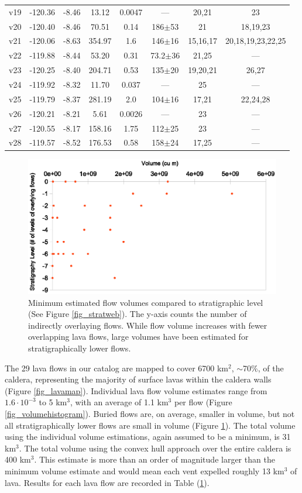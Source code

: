 \documentclass[12pt,letter]{article}
\begin{document}
\begin{center}
\begin{table}[h]
\begin{tabular}{l c c c c c c c}
				v19 & -120.36 & -8.46 & 13.12 & 0.0047 & --- & 20,21 & 23\\
				v20 & -120.40 & -8.46 & 70.51 & 0.14 & 186$\pm$53 & 21 & 18,19,23\\
				v21 & -120.06 & -8.63 & 354.97 & 1.6 & 146$\pm$16 & 15,16,17 & 20,18,19,23,22,25\\
				v22 & -119.88 & -8.44 & 53.20 & 0.31 & 73.2$\pm$36 & 21,25 & ---\\
				v23 & -120.25 & -8.40 & 204.71 & 0.53 & 135$\pm$20 & 19,20,21 & 26,27\\
				v24 & -119.92 & -8.32 & 11.70 & 0.037 & --- & 25 & ---\\
				v25 & -119.79 & -8.37 & 281.19 & 2.0 & 104$\pm$16 & 17,21 & 22,24,28\\
				v26 & -120.21 & -8.21 & 5.61 & 0.0026 & --- & 23 & ---\\
				v27 & -120.55 & -8.17 & 158.16 & 1.75 & 112$\pm$25 & 23 & ---\\
				v28 & -119.57 & -8.52 & 176.53 & 0.58 & 158$\pm$24 & 17,25 & ---\\
			\bottomrule
		\end{tabular}
		\label{tab_database}
		\end{table}
	\end{center}


\begin{figure}
\centering
\includegraphics[width=0.4\linewidth]{figures/volumeandstratigraphy}
\caption{Minimum estimated flow volumes compared to stratigraphic level (See Figure \ref{fig_stratweb}). The y-axis counts the number of indirectly overlaying flows. While flow volume increases with fewer overlapping lava flows, large volumes have been estimated for stratigraphically lower flows.}
\label{fig_volumeandstrat}
\end{figure}

The 29 lava flows in our catalog are mapped to cover 6700 km$^2$, $\sim$70\%, of the caldera, representing the majority of surface lavas within the caldera walls (Figure \ref{fig_lavamap}). Individual lava flow volume estimates range from $1.6\cdot 10^{-3}$ to 5 km$^3$, with an average of 1.1 km$^3$ per flow (Figure \ref{fig_volumehistogram}). Buried flows are, on average, smaller in volume, but not all stratigraphically lower flows are small in volume (Figure \ref{fig_volumeandstrat}). The total volume using the individual volume estimations, again assumed to be a minimum, is 31 km$^3$. The total volume using the convex hull approach over the entire caldera is 400 km$^3$. This estimate is more than an order of magnitude larger than the minimum volume estimate and would mean each vent expelled roughly 13 km$^3$ of lava. Results for each lava flow are recorded in Table (\ref{tab_database}).
\end{document}
